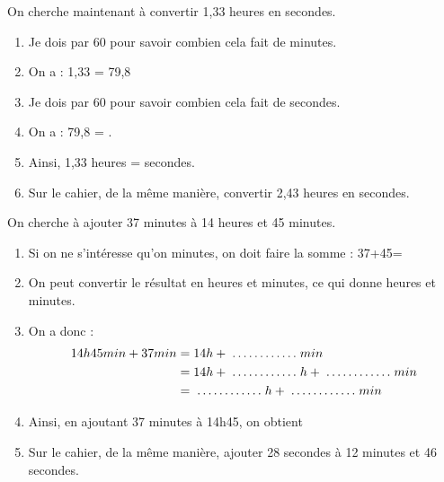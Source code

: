 On cherche maintenant à convertir 1,33 heures en secondes.

\begin{enumerate}
	\item Je dois \fillin par 60 pour savoir combien cela fait de minutes.
	\item On a : 1,33  = 79,8
	\item Je dois \fillin par 60 pour savoir combien cela fait de secondes.
	\item On a : 79,8  = \fillin.
	\item Ainsi, 1,33 heures = \fillin secondes.
	\item Sur le cahier, de la même manière, convertir 2,43 heures en secondes.
\end{enumerate}



On cherche à ajouter 37 minutes à 14 heures et 45 minutes.

\begin{enumerate}
	\item Si on ne s'intéresse qu'on minutes, on doit faire la somme : 37+45=\fillin
	\item On peut convertir le résultat en heures et minutes, ce qui donne \fillin[1cm] heures et \fillin[1cm] minutes.
	\item On a donc :
		\begin{align*}
			14h45min+37min &= 14h + \fillin min\\
				       &= 14h + \fillin h + \fillin min\\
				       &= \fillin h + \fillin min
		\end{align*}
		
	\item Ainsi, en ajoutant 37 minutes à 14h45, on obtient \dotfill
	\item Sur le cahier, de la même manière, ajouter 28 secondes à 12 minutes et 46 secondes.
\end{enumerate}


